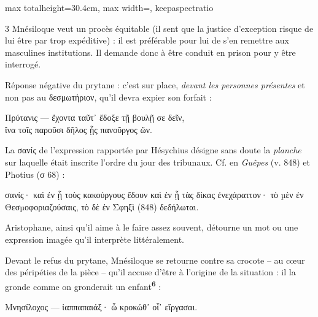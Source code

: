 \documentclass[11pt,twoside]{book}
\newcommand{\italique}[1]{\textit{#1}}
\newcommand{\citComm}[1]{\begin{quoting}[vskip=0.4pt,leftmargin=0.7em,rightmargin=0.2em]#1\end{quoting}}
\newcommand{\marqueur}[1]{\textsuperscript{\color{rubricRed}\textbf{#1}}}
\begin{document}
\begin{adjustbox}{max totalheight=30.4cm, max width=\textwidth, keepaspectratio}
\begin{minipage}{\textwidth}
{\begin{multicols}{3}
\noindent Mnésiloque veut un procès équitable (il sent que la justice d'exception risque de lui être par trop expéditive) : il est préférable pour lui de s'en remettre aux masculines institutions. Il demande donc à être conduit en prison pour y être interrogé.
\par\vspace{1.5pt}
\noindent Réponse négative du prytane : c'est sur place, \italique{devant les personnes présentes} et non pas au δεσμωτήριον, qu'il devra expier son forfait :
\citComm{Πρύτανις --- ἔχοντα ταῦτ᾽ ἔδοξε τῇ βουλῇ σε δεῖν,\\
ἵνα τοῖς παροῦσι δῆλος ᾖς πανοῦργος ὤν.\\}
La σανίς de l'expression rapportée par Hésychius désigne sans doute la \italique{planche} sur laquelle était inscrite l'ordre du jour des tribunaux.
Cf. en \italique{Guêpes} (v. 848) et Photius (σ 68) : 
\citComm{σανίς· καὶ ἐν ᾗ τοὺς κακούργους ἔδουν καὶ ἐν ᾗ τὰς δίκας ἐνεχάραττον· τὸ µὲν ἐν Θεσµοφοριαζούσαις, τὸ δὲ ἐν Σφηξὶ (848) δεδήλωται.}
Aristophane, ainsi qu'il aime à le faire assez souvent, détourne un mot ou une expression imagée qu'il interprète littéralement.

Devant le refus du prytane, Mnésiloque se retourne contre sa crocote -- au cœur des péripéties de la pièce -- qu'il accuse d'être à l'origine de la situation : il la gronde comme on gronderait un enfant\marqueur{6} :
\citComm{Μνησίλοχος --- ἰαππαπαιάξ· ὦ κροκώθ᾽ οἷ᾽ εἴργασαι.}


\end{multicols}}
\end{minipage}
\end{adjustbox}
\end{document}
